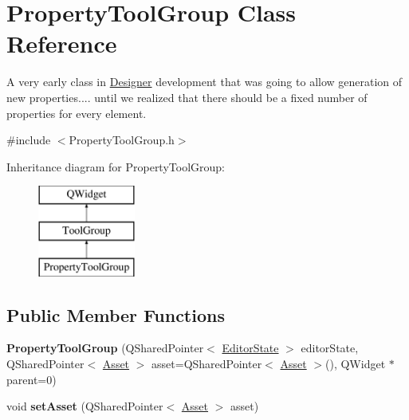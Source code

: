 \hypertarget{class_property_tool_group}{\section{Property\-Tool\-Group Class Reference}
\label{class_property_tool_group}
}


A very early class in \hyperlink{class_designer}{Designer} development that was going to allow generation of new properties.... until we realized that there should be a fixed number of properties for every element.  




{\ttfamily \#include $<$Property\-Tool\-Group.\-h$>$}

Inheritance diagram for Property\-Tool\-Group\-:\begin{figure}[H]
\begin{center}
\leavevmode
\includegraphics[height=3.000000cm]{class_property_tool_group}
\end{center}
\end{figure}
\subsection*{Public Member Functions}
\begin{DoxyCompactItemize}
\item 
\hypertarget{class_property_tool_group_a561c9e91f0b99c2c5f0a823f89c3821c}{{\bfseries Property\-Tool\-Group} (Q\-Shared\-Pointer$<$ \hyperlink{class_editor_state}{Editor\-State} $>$ editor\-State, Q\-Shared\-Pointer$<$ \hyperlink{class_picto_1_1_asset}{Asset} $>$ asset=Q\-Shared\-Pointer$<$ \hyperlink{class_picto_1_1_asset}{Asset} $>$(), Q\-Widget $\ast$parent=0)}\label{class_property_tool_group_a561c9e91f0b99c2c5f0a823f89c3821c}

\item 
\hypertarget{class_property_tool_group_afb7c938f11adb85dd9692a1d0311ed14}{void {\bfseries set\-Asset} (Q\-Shared\-Pointer$<$ \hyperlink{class_picto_1_1_asset}{Asset} $>$ asset)}\label{class_property_tool_group_afb7c938f11adb85dd9692a1d0311ed14}

\end{DoxyCompactItemize}
